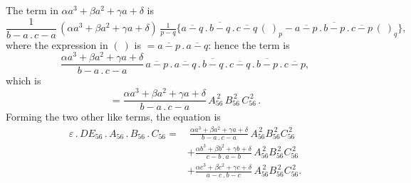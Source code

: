 \documentclass[11pt]{article}
\begin{document}
The term in $\alpha a^3 + \beta a^2 + \gamma a + \delta$ is
\[
\frac{1}{b-a\mathbin{.}c-a}\,(\alpha a^3 + \beta a^2 + \gamma a + \delta)\,\tfrac{1}{p-q}\bigl\{\overline{a-q}\mathbin{.}\overline{b-q}\mathbin{.}\overline{c-q}\,(\ )_p - \overline{a-p}\mathbin{.}\overline{b-p}\mathbin{.}\overline{c-p}\,(\ )_q\bigr\},
\]
where the expression in $(\ )$ is $= \overline{a-p}\mathbin{.}\overline{a-q}$: hence the term is
\[
\frac{\alpha a^3 + \beta a^2 + \gamma a + \delta}{b-a\mathbin{.}c-a}\,\overline{a-p}\mathbin{.}\overline{a-q}\mathbin{.}\overline{b-q}\mathbin{.}\overline{c-q}\mathbin{.}\overline{b-p}\mathbin{.}\overline{c-p},
\]
which is
\[
= \frac{\alpha a^3 + \beta a^2 + \gamma a + \delta}{b-a\mathbin{.}c-a}\,A_{56}^{\,2}\, B_{56}^{\,2}\, C_{56}^{\,2}\,.
\]
Forming the two other like terms, the equation is
\begin{align*}
\varepsilon\mathbin{.}DE_{56}\mathbin{.}A_{56}\mathbin{.}B_{56}\mathbin{.}C_{56} = &\ \frac{\alpha a^3 + \beta a^2 + \gamma a + \delta}{b-a\mathbin{.}c-a}\, A_{56}^{\,2} B_{56}^{\,2} C_{56}^{\,2}\\
&+ \frac{\alpha b^3 + \beta b^2 + \gamma b + \delta}{c-b\mathbin{.}a-b}\, A_{56}^{\,2} B_{56}^{\,2} C_{56}^{\,2}\\
&+ \frac{\alpha c^3 + \beta c^2 + \gamma c + \delta}{a-c\mathbin{.}b-c}\, A_{56}^{\,2} B_{56}^{\,2} C_{56}^{\,2}.
\end{align*}
\end{document}
